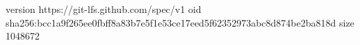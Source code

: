 version https://git-lfs.github.com/spec/v1
oid sha256:bcc1a9f265ee0fbff8a83b7e5f1e53ce17eed5f62352973abc8d874be2ba818d
size 1048672
